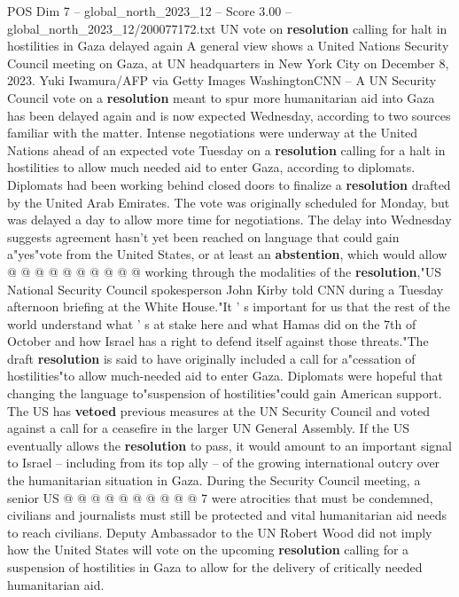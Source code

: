 \begin{textsample}{POS Dim 7 – global\_north\_2023\_12 – Score 3.00 – global\_north\_2023\_12/200077172.txt}  \label{ex:f7_pos_303}
UN vote on \textbf{resolution} calling for halt in hostilities in Gaza delayed again A general view shows a United Nations Security Council meeting on Gaza, at UN headquarters in New York City on December 8, 2023.
Yuki Iwamura/AFP via Getty Images WashingtonCNN -- A UN Security Council vote on a \textbf{resolution} meant to spur more humanitarian aid into Gaza has been delayed again and is now expected Wednesday, according to two sources familiar with the matter.
Intense negotiations were underway at the United Nations ahead of an expected vote Tuesday on a \textbf{resolution} calling for a halt in hostilities to allow much needed aid to enter Gaza, according to diplomats.
Diplomats had been working behind closed doors to finalize a \textbf{resolution} drafted by the United Arab Emirates.
The vote was originally scheduled for Monday, but was delayed a day to allow more time for negotiations.
The delay into Wednesday suggests agreement hasn't yet been reached on language that could gain a"yes"vote from the United States, or at least an \textbf{abstention}, which would allow @ @ @ @ @ @ @ @ @ @ working through the modalities of the \textbf{resolution},"US National Security Council spokesperson John Kirby told CNN during a Tuesday afternoon briefing at the White House."It ' s important for us that the rest of the world understand what ' s at stake here and what Hamas did on the 7th of October and how Israel has a right to defend itself against those threats."The draft \textbf{resolution} is said to have originally included a call for a"cessation of hostilities"to allow much-needed aid to enter Gaza.
Diplomats were hopeful that changing the language to"suspension of hostilities"could gain American support.
The US has \textbf{vetoed} previous measures at the UN Security Council and voted against a call for a ceasefire in the larger UN General Assembly.
If the US eventually allows the \textbf{resolution} to pass, it would amount to an important signal to Israel -- including from its top ally -- of the growing international outcry over the humanitarian situation in Gaza.
During the Security Council meeting, a senior US @ @ @ @ @ @ @ @ @ @ 7 were atrocities that must be condemned, civilians and journalists must still be protected and vital humanitarian aid needs to reach civilians.
Deputy Ambassador to the UN Robert Wood did not imply how the United States will vote on the upcoming \textbf{resolution} calling for a suspension of hostilities in Gaza to allow for the delivery of critically needed humanitarian aid.

\end{textsample}
